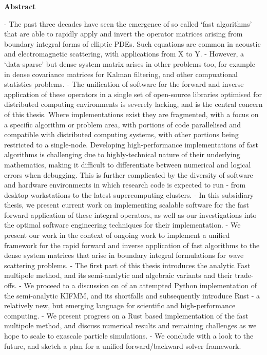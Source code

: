 \thispagestyle{plain}

\begin{center}
    \textbf{Abstract}
\end{center}

- The past three decades have seen the emergence of so called `fast algorithms' that are able to rapidly apply and invert the operator matrices arising from boundary integral forms of elliptic PDEs. Such equations are common in acoustic and electromagnetic scattering, with applications from X to Y.
- However, a `data-sparse' but dense system matrix arises in other problems too, for example in dense covariance matrices for Kalman filtering, and other compuational statistics problems.
- The unification of software for the forward and inverse application of these operators in a single set of open-source libraries optimised for distributed computing environments is severely lacking, and is the central concern of this thesis. Where implementations exist they are fragmented, with a focus on a specific algorithm or problem area, with portions of code parallelised and compatible with distributed computing systems, with other portions being restricted to a single-node. Developing high-performance implementations of fast algorithms is challenging due to highly-technical nature of their underlying mathematics, making it difficult to differentiate between numerical and logical errors when debugging. This is further complicated by the diversity of software and hardware environments in which research code is expected to run - from desktop workstations to the latest supercomputing clusters. 
- In this subsidiary thesis, we present current work on implementing scalable software for the fast forward application of these integral operators, as well as our investigations into the optimal software engineering techniques for their implementation.
- We present our work in the context of ongoing work to implement a unified framework for the rapid forward and inverse application of fast algorithms to the dense system matrices that arise in boundary integral formulations for wave scattering problems.
- The first part of this thesis introduces the analytic Fast multipole method, and its semi-analytic and algebraic variants and their trade-offs.
- We proceed to a discussion on of an attempted Python implementation of the semi-analytic KIFMM, and its shortfalls and subsequently introduce Rust - a relatively new, but emerging language for scientific and high-performance computing.
- We present progress on a Rust based implementation of the fast multipole method, and discuss numerical results and remaining challenges as we hope to scale to exascale particle simulations.
- We conclude with a look to the future, and sketch a plan for a unified forward/backward solver framework.


